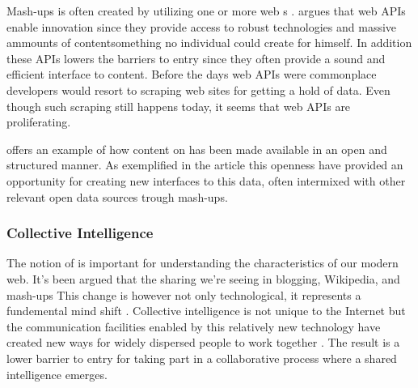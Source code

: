 Mash-ups is often created by utilizing one or more web s%
.
\citet[]{floyd07} argues that web APIs enable innovation since they
provide access to robust technologies and massive ammounts of
content\dash{}something no individual could create for himself. In addition
these APIs lowers the barriers to entry since they often provide a sound
and efficient interface to content. Before the days web APIs were commonplace
developers would resort to scraping web sites for getting a hold of data.
Even though such scraping still happens today, it seems that web APIs are
proliferating.

\citet{auer07} offers an example of how content on %
has been made available in an open and structured manner. As exemplified
in the article this openness have provided an opportunity for creating new
interfaces to this data, often intermixed with other relevant open
data sources trough mash-ups.

\subsubsection{Collective Intelligence}
The notion of  is important for understanding
the characteristics of our modern web. It's been argued that the sharing we're
seeing in blogging, Wikipedia, and mash-ups
This change is however not only technological, it represents a fundemental
mind shift \citep[]{kolbitsch06}.
Collective intelligence is not unique
to the Internet but the communication facilities enabled by this relatively
new technology have created new ways for widely dispersed people to work
together \citep{mitcenter08}. The result is a lower barrier to entry for
taking part in a collaborative process where a shared intelligence emerges.

